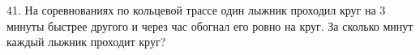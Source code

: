 41. На соревнованиях по кольцевой трассе один лыжник проходил круг на 3 минуты быстрее другого и через час обогнал его ровно на круг. За сколько минут каждый лыжник проходит круг?\\
